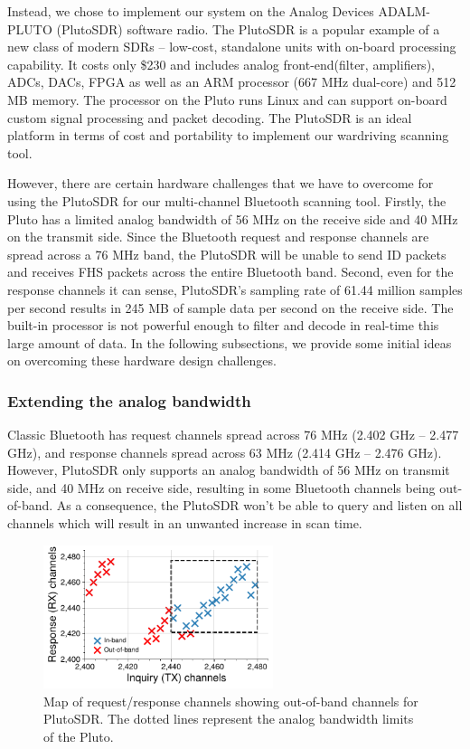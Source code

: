 Instead, we chose to implement our system on the Analog Devices ADALM-PLUTO (PlutoSDR) software radio. 
%
The PlutoSDR is a popular example of a new class of modern SDRs -- low-cost, standalone units with on-board processing capability. 
%
It costs only \$230 and includes analog front-end(filter, amplifiers), ADCs, DACs, FPGA as well as an ARM processor (667 MHz dual-core) and 512 MB memory. 
%
The processor on the Pluto runs Linux and can support on-board custom signal processing and packet decoding. 
%
The PlutoSDR is an ideal platform in terms of cost and portability to implement our wardriving scanning tool.
%

However, there are certain hardware challenges that we have to overcome for using the PlutoSDR for our multi-channel Bluetooth scanning tool.
%
Firstly, the Pluto has a limited analog bandwidth of 56 MHz on the receive side and 40 MHz on the transmit side. 
%
Since the Bluetooth request and response channels are spread across a 76 MHz band, the PlutoSDR will be unable to send ID packets and receives FHS packets across the entire Bluetooth band.
%
Second, even for the response channels it can sense, PlutoSDR's sampling rate of 61.44 million samples per second results in 245 MB of sample data per second on the receive side. 
%
The built-in processor is not powerful enough to filter and decode in real-time this large amount of data.
%
In the following subsections, we provide some initial ideas on overcoming these hardware design challenges.

\subsubsection{Extending the analog bandwidth}
Classic Bluetooth has request channels spread across 76 MHz (2.402 GHz -- 2.477 GHz), and response channels spread across 63 MHz (2.414 GHz -- 2.476 GHz).
%
However, PlutoSDR only supports an analog bandwidth of 56 MHz on transmit side, and 40 MHz on receive side, resulting in some Bluetooth channels being out-of-band.
%
As a consequence, the PlutoSDR won't be able to query and listen on all channels which will result in an unwanted increase in scan time.
%
\begin{figure}[h!]
    \centering
    \captionsetup{justification=centering}
    \includegraphics[width=0.6\textwidth]{hyperscanner/plots/inq_resp_og.pdf}
    \caption{Map of request/response channels showing out-of-band channels for PlutoSDR. The dotted lines represent the analog bandwidth limits of the Pluto.}
    \label{fig:hyperscanner:outofband}
\end{figure}

